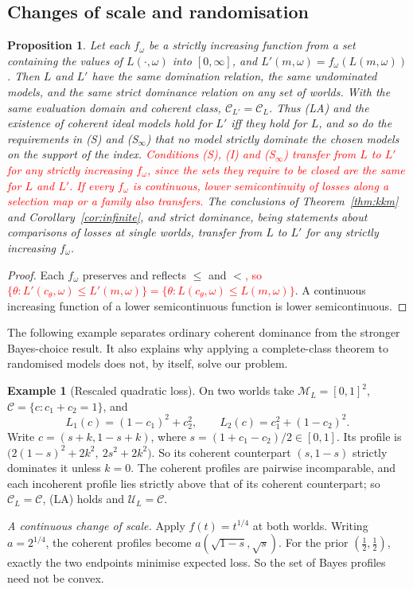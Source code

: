 \documentclass[11pt]{article}
\newtheorem{proposition}[theorem]{Proposition}
\theoremstyle{definition}
\newtheorem{example}[theorem]{Example}
\theoremstyle{remark}
\newcommand{\M}{\mathcal M}
\newcommand{\C}{\mathcal C}
\newcommand{\U}{\mathcal U}
\begin{document}
\subsection{Changes of scale and randomisation}\label{sec:ordinal}
\begin{proposition}\label{prop:ordinal}
Let each $f_\omega$ be a strictly increasing function from a set containing the values of $L(\cdot,\omega)$ into $[0,\infty]$, and $L'(m,\omega)=f_\omega(L(m,\omega))$. Then $L$ and $L'$ have the same domination relation, the same undominated models, and the same strict dominance relation on any set of worlds. With the same evaluation domain and coherent class, $\C_{L\prime}=\C_L$. Thus (LA) and the existence of coherent ideal models hold for $L'$ iff they hold for $L$, and so do the requirements in (S) and (S$_\infty$) that no model strictly dominate the chosen models on the support of the index. \textcolor{red}{Conditions (S), (I) and (S$_\infty$) transfer from $L$ to $L'$ for any strictly increasing $f_\omega$, since the sets they require to be closed are the same for $L$ and $L'$. If every $f_\omega$ is continuous, lower semicontinuity of losses along a selection map or a family also transfers.} The conclusions of Theorem~\ref{thm:kkm} and Corollary~\ref{cor:infinite}, and strict dominance, being statements about comparisons of losses at single worlds, transfer from $L$ to $L'$ for any strictly increasing $f_\omega$.
\end{proposition}
\begin{proof}
Each $f_\omega$ preserves and reflects $\le$ and $<$\textcolor{red}{, so $\{\theta:L'(c_\theta,\omega)\le L'(m,\omega)\}=\{\theta:L(c_\theta,\omega)\le L(m,\omega)\}$}. A continuous increasing function of a lower semicontinuous function is lower semicontinuous.
\end{proof}

The following example separates ordinary coherent dominance from the stronger Bayes-choice result. It also explains why applying a complete-class theorem to randomised models does not, by itself, solve our problem.
\begin{example}[Rescaled quadratic loss]\label{ex:rescale}
On two worlds take $\M_L=[0,1]^2$, $\C=\{c:c_1+c_2=1\}$, and
\[
 L_1(c)=(1-c_1)^2+c_2^2,\qquad L_2(c)=c_1^2+(1-c_2)^2.
\]
Write $c=(s+k,1-s+k)$, where $s=(1+c_1-c_2)/2\in[0,1]$. Its profile is $\bigl(2(1-s)^2+2k^2,\ 2s^2+2k^2\bigr)$. So its coherent counterpart $(s,1-s)$ strictly dominates it unless $k=0$. The coherent profiles are pairwise incomparable, and each incoherent profile lies strictly above that of its coherent counterpart; so $\C_L=\C$, (LA) holds and $\U_L=\C$.

\emph{A continuous change of scale.} Apply $f(t)=t^{1/4}$ at both worlds. Writing $a=2^{1/4}$, the coherent profiles become $a(\sqrt{1-s},\sqrt s)$. For the prior $(\tfrac12,\tfrac12)$, exactly the two endpoints minimise expected loss. So the set of Bayes profiles need not be convex.

\end{example}
\end{document}

